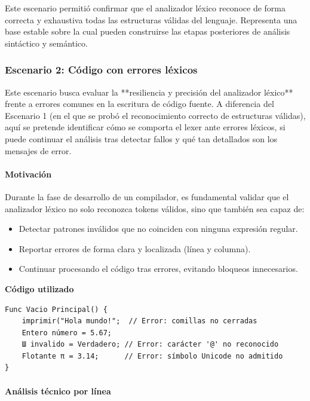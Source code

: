 \documentclass{article}
\begin{document}
Este escenario permitió confirmar que el analizador léxico reconoce de forma correcta y exhaustiva todas las estructuras válidas del lenguaje. Representa una base estable sobre la cual pueden construirse las etapas posteriores de análisis sintáctico y semántico.


\subsubsection{Escenario 2: Código con errores léxicos}

Este escenario busca evaluar la **resiliencia y precisión del analizador léxico** frente a errores comunes en la escritura de código fuente. A diferencia del Escenario 1 (en el que se probó el reconocimiento correcto de estructuras válidas), aquí se pretende identificar cómo se comporta el lexer ante errores léxicos, si puede continuar el análisis tras detectar fallos y qué tan detallados son los mensajes de error.

\paragraph{Motivación}

Durante la fase de desarrollo de un compilador, es fundamental validar que el analizador léxico no solo reconozca tokens válidos, sino que también sea capaz de:

\begin{itemize}
  \item Detectar patrones inválidos que no coinciden con ninguna expresión regular.
  \item Reportar errores de forma clara y localizada (línea y columna).
  \item Continuar procesando el código tras errores, evitando bloqueos innecesarios.
\end{itemize}

\textbf{Código utilizado}

\begin{lstlisting}[style=mypython, caption={Fragmento con errores léxicos intencionados}]
Func Vacio Principal() {
    imprimir("Hola mundo!";  // Error: comillas no cerradas
    Entero número = 5.67;
    Ш invalido = Verdadero; // Error: carácter '@' no reconocido
    Flotante π = 3.14;      // Error: símbolo Unicode no admitido
}
\end{lstlisting}

\paragraph{Análisis técnico por línea}
\end{document}
